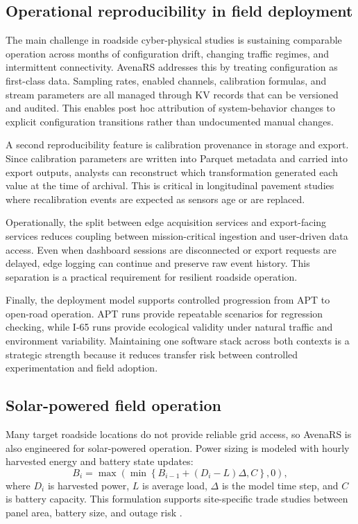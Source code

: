 \documentclass[conference]{IEEEtran}
\begin{document}
\subsection{Operational reproducibility in field deployment}
The main challenge in roadside cyber-physical studies is sustaining comparable operation across months of configuration drift, changing traffic regimes, and intermittent connectivity. AvenaRS addresses this by treating configuration as first-class data. Sampling rates, enabled channels, calibration formulas, and stream parameters are all managed through KV records that can be versioned and audited. This enables post hoc attribution of system-behavior changes to explicit configuration transitions rather than undocumented manual changes.

A second reproducibility feature is calibration provenance in storage and export. Since calibration parameters are written into Parquet metadata and carried into export outputs, analysts can reconstruct which transformation generated each value at the time of archival. This is critical in longitudinal pavement studies where recalibration events are expected as sensors age or are replaced.

Operationally, the split between edge acquisition services and export-facing services reduces coupling between mission-critical ingestion and user-driven data access. Even when dashboard sessions are disconnected or export requests are delayed, edge logging can continue and preserve raw event history. This separation is a practical requirement for resilient roadside operation.

Finally, the deployment model supports controlled progression from APT to open-road operation. APT runs provide repeatable scenarios for regression checking, while I-65 runs provide ecological validity under natural traffic and environment variability. Maintaining one software stack across both contexts is a strategic strength because it reduces transfer risk between controlled experimentation and field adoption.

\subsection{Solar-powered field operation}
Many target roadside locations do not provide reliable grid access, so AvenaRS is also engineered for solar-powered operation. Power sizing is modeled with hourly harvested energy and battery state updates:
\begin{equation}
B_i = \max\left(\min\left\{B_{i-1} + (D_i-L)\Delta, C\right\}, 0\right),
\end{equation}
where $D_i$ is harvested power, $L$ is average load, $\Delta$ is the model time step, and $C$ is battery capacity. This formulation supports site-specific trade studies between panel area, battery size, and outage risk \cite{KHATIB20122864, nasapowerpaper, nasaAPI, chamola}.
\end{document}
